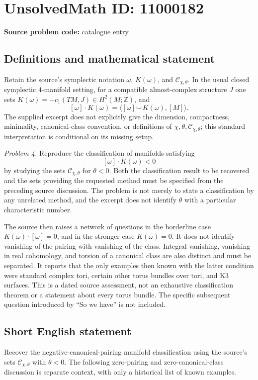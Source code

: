 \documentclass[11pt]{article}
\newcommand{\Z}{\mathbb{Z}}
\begin{document}
\section*{UnsolvedMath ID: 11000182}
\textbf{Source problem code:} catalogue entry
\subsection{Definitions and mathematical statement}
Retain the source's symplectic notation \(\omega\), \(K(\omega)\), and \(\mathcal C_{\chi,\theta}\). In the usual closed symplectic \(4\)-manifold setting, for a compatible almost-complex structure \(J\) one sets \(K(\omega)=-c_1(TM,J)\in H^2(M;\Z)\), and
\[
 [\omega]\cdot K(\omega)=\langle[\omega]\smile K(\omega),[M]\rangle.
\]
The supplied excerpt does not explicitly give the dimension, compactness, minimality, canonical-class convention, or definitions of \(\chi,\theta,\mathcal C_{\chi,\theta}\); this standard interpretation is conditional on its missing setup.

\emph{Problem 4.} Reproduce the classification of manifolds satisfying
\[
 [\omega]\cdot K(\omega)<0
\]
by studying the sets \(\mathcal C_{\chi,\theta}\) for \(\theta<0\). Both the classification result to be recovered and the sets providing the requested method must be specified from the preceding source discussion. The problem is not merely to state a classification by any unrelated method, and the excerpt does not identify \(\theta\) with a particular characteristic number.

The source then raises a network of questions in the borderline case \(K(\omega)\cdot[\omega]=0\), and in the stronger case \(K(\omega)=0\). It does not identify vanishing of the pairing with vanishing of the class. Integral vanishing, vanishing in real cohomology, and torsion of a canonical class are also distinct and must be separated. It reports that the only examples then known with the latter condition were standard complex tori, certain other torus bundles over tori, and K3 surfaces. This is a dated source assessment, not an exhaustive classification theorem or a statement about every torus bundle. The specific subsequent question introduced by ``So we have'' is not included.
\subsection{Short English statement}
Recover the negative-canonical-pairing manifold classification using the source's sets \(\mathcal C_{\chi,\theta}\) with \(\theta<0\). The following zero-pairing and zero-canonical-class discussion is separate context, with only a historical list of known examples.
\end{document}
